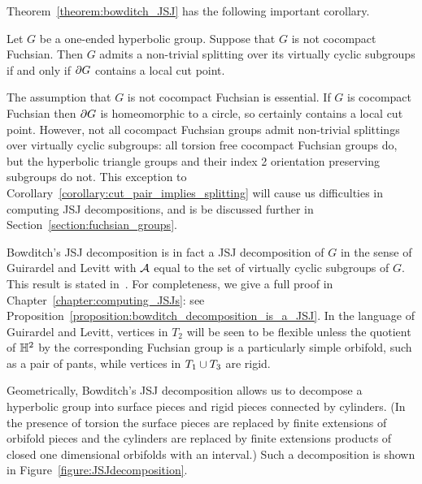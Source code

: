 Theorem~\ref{theorem:bowditch_JSJ} has the following important corollary.

\begin{corollary}\cite[Theorem 6.2]{bowditch98}
  \label{corollary:cut_pair_implies_splitting}
  Let $G$ be a one-ended hyperbolic group. 
  Suppose that $G$ is not cocompact Fuchsian. 
  Then $G$ admits a non-trivial splitting over its virtually cyclic subgroups if and only if $\partial G$ contains a local cut point.
\end{corollary}

\begin{remark}
  The assumption that $G$ is not cocompact Fuchsian is essential.
  If $G$ is cocompact Fuchsian then $\partial G$ is homeomorphic to a circle, so certainly contains a local cut point.
  However, not all cocompact Fuchsian groups admit non-trivial splittings over virtually cyclic subgroups: all torsion free cocompact Fuchsian groups do, but the hyperbolic triangle groups and their index 2 orientation preserving subgroups do not.
  This exception to Corollary~\ref{corollary:cut_pair_implies_splitting} will cause us difficulties in computing JSJ decompositions, and is be discussed further in Section~\ref{section:fuchsian_groups}.
\end{remark}

\begin{remark}
  Bowditch's JSJ decomposition is in fact a JSJ decomposition of $G$ in the sense of Guirardel and Levitt with $\mathcal{A}$ equal to the set of virtually cyclic subgroups of $G$.
  This result is stated in~\cite{guirardellevitt17}. For completeness, we give a full proof in Chapter~\ref{chapter:computing_JSJs}: see Proposition~\ref{proposition:bowditch_decomposition_is_a_JSJ}.
  In the language of Guirardel and Levitt, vertices in $T_2$ will be seen to be flexible unless the quotient of $\mathbb{H}^2$ by the corresponding Fuchsian group is a particularly simple orbifold, such as a pair of pants, while vertices in $T_1 \cup T_3$ are rigid.
\end{remark}

Geometrically, Bowditch's JSJ decomposition allows us to decompose a hyperbolic group into surface pieces and rigid pieces connected by cylinders.
(In the presence of torsion the surface pieces are replaced by finite extensions of orbifold pieces and the cylinders are replaced by finite extensions products of closed one dimensional orbifolds with an interval.)
Such a decomposition is shown in Figure~\ref{figure:JSJdecomposition}.


